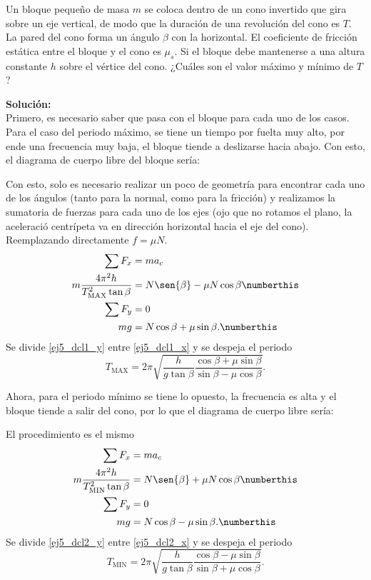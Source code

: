 \begin{mdframed}[style=warning]
	\begin{ejercicio}
		Un bloque pequeño de masa $m$ se coloca dentro de un cono invertido que gira sobre un eje vertical, de modo que la duración de una revolución del cono es $T$. La pared del cono forma un ángulo $\beta$ con la horizontal. El coeficiente de fricción estática entre el bloque y el cono es $\mu _s$. Si el bloque debe mantenerse a una altura constante $h$ sobre el vértice del cono. ¿Cuáles son el valor máximo y mínimo de $T$?
	\end{ejercicio}
	\noindent \textbf{Solución: } \\
	Primero, es necesario saber que pasa con el bloque para cada uno de los casos. Para el caso del periodo máximo, se tiene un tiempo por fuelta muy alto, por ende una frecuencia muy baja, el bloque tiende a deslizarse hacia abajo. Con esto, el diagrama de cuerpo libre del bloque sería:
		\begin{center}
			
		\end{center}
	Con esto, solo es necesario realizar un poco de geometría para encontrar cada uno de los ángulos (tanto para la normal, como para la fricción) y realizamos la sumatoria de fuerzas para cada uno de los ejes (ojo que no rotamos el plano, la aceleració centrípeta va en dirección horizontal hacia el eje del cono). Reemplazando directamente $f = \mu N$.
	\begin{align*}
		\sum F_x &= ma_c \\
		m\frac{4\pi ^2 h}{T_{\text{MAX}} ^2 \tan{\beta}} &= N\sen{\beta} - \mu N \cos{\beta} \numberthis \label{ej5_dcl1_x} \\
		\sum F_y &= 0 \\
		mg &= N\cos{\beta} + \mu \sin{\beta}. \numberthis \label{ej5_dcl1_y}
	\end{align*}
	Se divide \eqref{ej5_dcl1_y} entre \eqref{ej5_dcl1_x} y se despeja el periodo
		$$ \boxed{ T_{\text{MAX}} = 2\pi \sqrt{\frac{h}{g\tan{\beta}} \frac{\cos{\beta} + \mu \sin{\beta}}{\sin{\beta} - \mu \cos{\beta}} } . } $$
		
	Ahora, para el periodo mínimo se tiene lo opuesto, la frecuencia es alta y el bloque tiende a salir del cono, por lo que el diagrama de cuerpo libre sería:
	\begin{center}
		
	\end{center}
	El procedimiento es el mismo
	\begin{align*}
		\sum F_x &= ma_c \\
		m\frac{4\pi ^2 h}{T_{\text{MIN}} ^2 \tan{\beta}} &= N\sen{\beta} + \mu N \cos{\beta} \numberthis \label{ej5_dcl2_x} \\
		\sum F_y &= 0 \\
		mg &= N\cos{\beta} - \mu \sin{\beta}. \numberthis \label{ej5_dcl2_y}
	\end{align*}
	Se divide \eqref{ej5_dcl2_y} entre \eqref{ej5_dcl2_x} y se despeja el periodo
		$$ \boxed{ T_{\text{MIN}} = 2\pi \sqrt{\frac{h}{g\tan{\beta}} \frac{\cos{\beta} - \mu \sin{\beta}}{\sin{\beta} + \mu \cos{\beta}} } . } $$
\end{mdframed}
